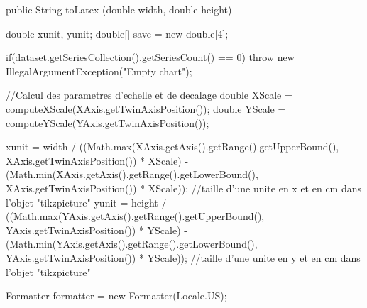 \begin{code}

   public String toLatex (double width, double height) \begin{hide} {
      double xunit, yunit;
      double[] save = new double[4];

      if(dataset.getSeriesCollection().getSeriesCount() == 0)
         throw new IllegalArgumentException("Empty chart");

      //Calcul des parametres d'echelle et de decalage
      double XScale = computeXScale(XAxis.getTwinAxisPosition());
      double YScale = computeYScale(YAxis.getTwinAxisPosition());

      xunit = width / ((Math.max(XAxis.getAxis().getRange().getUpperBound(), XAxis.getTwinAxisPosition()) * XScale) - (Math.min(XAxis.getAxis().getRange().getLowerBound(), XAxis.getTwinAxisPosition()) * XScale));
      //taille d'une unite en x et en cm dans l'objet "tikzpicture"
      yunit = height / ((Math.max(YAxis.getAxis().getRange().getUpperBound(), YAxis.getTwinAxisPosition()) * YScale) - (Math.min(YAxis.getAxis().getRange().getLowerBound(), YAxis.getTwinAxisPosition()) * YScale));
      //taille d'une unite en y et en cm dans l'objet "tikzpicture"

      Formatter formatter = new Formatter(Locale.US);

}
\end{hide}
\end{code}
